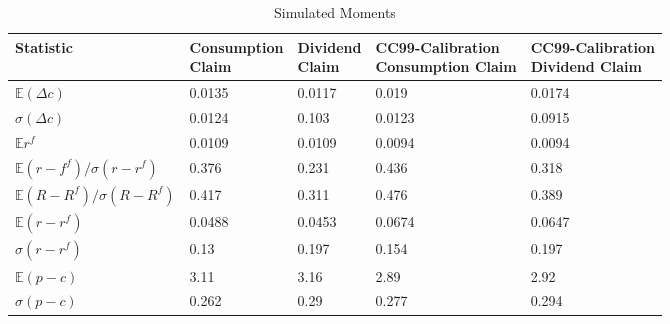 \begin{table}[H]
\centering
\caption{Simulated Moments}
\label{tab:simmom}
\begin{tabular}{@{}lllll@{}}
\toprule
Statistic                                               & \makecell{Consumption \\ Claim} & \makecell{Dividend \\ Claim} & \makecell{CC99-Calibration \\ Consumption Claim} & \makecell{CC99-Calibration\\ Dividend Claim} \\ \midrule
$\mathbb{E}\left(\Delta c \right)$                      &0.0135&0.0117&0.019&0.0174\\
$\sigma\left(\Delta c \right)$                          &0.0124&0.103&0.0123&0.0915\\
$\mathbb{E}r^f$                                         &0.0109&0.0109&0.0094&0.0094\\
$\mathbb{E}\left(r-f^f\right)/\sigma\left(r-r^f\right)$ &0.376&0.231& 0.436                                       &         0.318                            \\
$\mathbb{E}\left(R-R^f\right)/\sigma\left(R-R^f\right)$ & 0.417   & 0.311               &  0.476                                      &      0.389                               \\
$\mathbb{E}\left(r-r^f\right)$                          &  0.0488                 &      0.0453          &         0.0674                               &        0.0647                             \\
$\sigma\left(r-r^f\right)$                              &     0.13              &       0.197           &   0.154                                       &                  0.197                     \\
$\mathbb{E}\left(p-c\right)$                          &     3.11                &      3.16            &         2.89                                 &             2.92                          \\
$\sigma\left(p-c\right)$                              &       0.262            &      0.29          &   0.277                                     & 0.294                                    \\ \bottomrule
\end{tabular}
\end{table}
